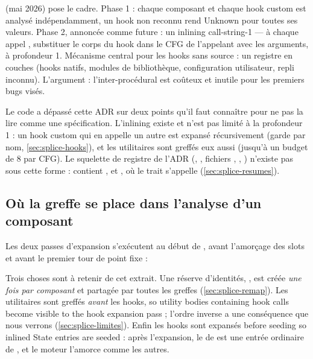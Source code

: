 \begin{decision}
 (mai 2026) pose le cadre. Phase 1 : chaque composant et chaque hook custom est analysé indépendamment, un hook non reconnu rend \og Unknown\fg{} pour toutes ses valeurs. Phase 2, annoncée comme future : un inlining \og call-string-1\fg{} --- à chaque appel , substituer le corps du hook dans le CFG de l'appelant avec les arguments, à profondeur 1. Mécanisme central pour les hooks sans source : un registre en couches (hooks natifs, modules de bibliothèque, configuration utilisateur, repli \og inconnu\fg{}). L'argument : l'inter-procédural est coûteux et inutile pour les premiers bugs visés.

Le code a dépassé cette ADR sur deux points qu'il faut connaître pour ne pas la lire comme une spécification. L'inlining existe et n'est pas limité à la profondeur 1 : un hook custom qui en appelle un autre est expansé récursivement (garde par nom, \cref{sec:splice-hooks}), et les utilitaires sont greffés eux aussi (jusqu'à un budget de 8 par CFG). Le squelette de registre de l'ADR (, , fichiers , , ) n'existe pas sous cette forme :  contient ,  et , où le trait s'appelle  (\cref{sec:splice-resumes}).
\end{decision}

\subsection{Où la greffe se place dans l'analyse d'un composant}

Les deux passes d'expansion s'exécutent au début de , avant l'amorçage des slots et avant le premier tour de point fixe :


Trois choses sont à retenir de cet extrait. Une réserve d'identités, , est créée \emph{une fois par composant} et partagée par toutes les greffes (\cref{sec:splice-remap}). Les utilitaires sont greffés \emph{avant} les hooks, \og so utility bodies containing hook calls become visible to the hook expansion pass\fg{} ; l'ordre inverse a une conséquence que nous verrons (\cref{sec:splice-limites}). Enfin les hooks sont expansés \og before seeding so inlined State entries are seeded\fg{} : après l'expansion, le  de  est une entrée  ordinaire de , et le moteur l'amorce comme les autres.

